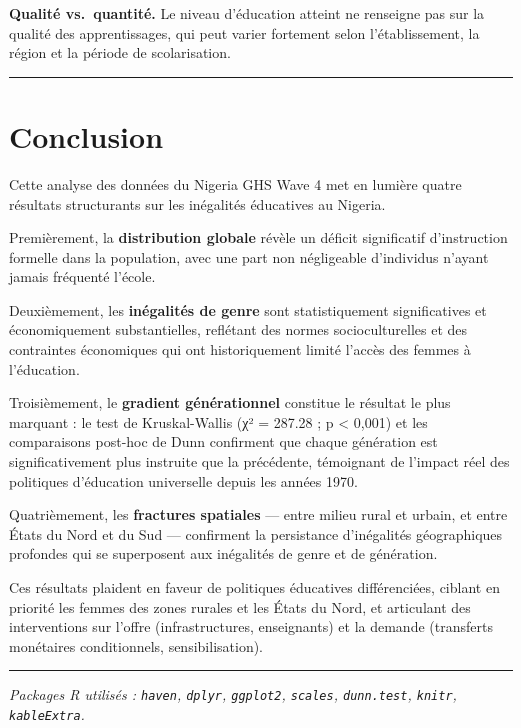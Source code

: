 \documentclass[
]{article}
\begin{document}
\textbf{Qualité vs.~quantité.} Le niveau d'éducation atteint ne
renseigne pas sur la qualité des apprentissages, qui peut varier
fortement selon l'établissement, la région et la période de
scolarisation.

\begin{center}\rule{0.5\linewidth}{0.5pt}\end{center}

\section{Conclusion}\label{conclusion}

Cette analyse des données du Nigeria GHS Wave 4 met en lumière quatre
résultats structurants sur les inégalités éducatives au Nigeria.

Premièrement, la \textbf{distribution globale} révèle un déficit
significatif d'instruction formelle dans la population, avec une part
non négligeable d'individus n'ayant jamais fréquenté l'école.

Deuxièmement, les \textbf{inégalités de genre} sont statistiquement
significatives et économiquement substantielles, reflétant des normes
socioculturelles et des contraintes économiques qui ont historiquement
limité l'accès des femmes à l'éducation.

Troisièmement, le \textbf{gradient générationnel} constitue le résultat
le plus marquant : le test de Kruskal-Wallis (χ² = 287.28 ; p
\textless{} 0,001) et les comparaisons post-hoc de Dunn confirment que
chaque génération est significativement plus instruite que la
précédente, témoignant de l'impact réel des politiques d'éducation
universelle depuis les années 1970.

Quatrièmement, les \textbf{fractures spatiales} --- entre milieu rural
et urbain, et entre États du Nord et du Sud --- confirment la
persistance d'inégalités géographiques profondes qui se superposent aux
inégalités de genre et de génération.

Ces résultats plaident en faveur de politiques éducatives différenciées,
ciblant en priorité les femmes des zones rurales et les États du Nord,
et articulant des interventions sur l'offre (infrastructures,
enseignants) et la demande (transferts monétaires conditionnels,
sensibilisation).

\begin{center}\rule{0.5\linewidth}{0.5pt}\end{center}

\emph{Packages R utilisés : \texttt{haven}, \texttt{dplyr},
\texttt{ggplot2}, \texttt{scales}, \texttt{dunn.test}, \texttt{knitr},
\texttt{kableExtra}.}
\end{document}
